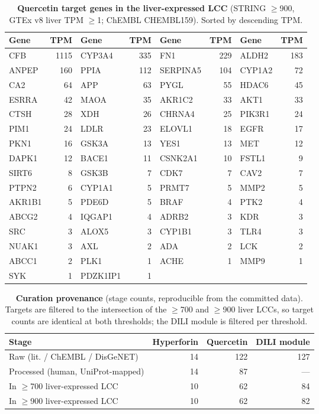 \begin{table}[ht]
\centering
\caption{\textbf{Quercetin target genes in the liver-expressed LCC} (STRING $\geq$900, GTEx v8 liver TPM $\geq$1; ChEMBL CHEMBL159). Sorted by descending TPM.}
\label{tab:s_quer}
\scriptsize
\begin{tabular}{lrlrlrlr}
\toprule
\textbf{Gene} & \textbf{TPM} & \textbf{Gene} & \textbf{TPM} & \textbf{Gene} & \textbf{TPM} & \textbf{Gene} & \textbf{TPM} \\
\midrule
CFB & 1115 & CYP3A4 & 335 & FN1 & 229 & ALDH2 & 183 \\
ANPEP & 160 & PPIA & 112 & SERPINA5 & 104 & CYP1A2 & 72 \\
CA2 & 64 & APP & 63 & PYGL & 55 & HDAC6 & 45 \\
ESRRA & 42 & MAOA & 35 & AKR1C2 & 33 & AKT1 & 33 \\
CTSH & 28 & XDH & 26 & CHRNA4 & 25 & PIK3R1 & 24 \\
PIM1 & 24 & LDLR & 23 & ELOVL1 & 18 & EGFR & 17 \\
PKN1 & 16 & GSK3A & 13 & YES1 & 13 & MET & 12 \\
DAPK1 & 12 & BACE1 & 11 & CSNK2A1 & 10 & FSTL1 & 9 \\
SIRT6 & 8 & GSK3B & 7 & CDK7 & 7 & CAV2 & 7 \\
PTPN2 & 6 & CYP1A1 & 5 & PRMT7 & 5 & MMP2 & 5 \\
AKR1B1 & 5 & PDE6D & 5 & BRAF & 4 & PTK2 & 4 \\
ABCG2 & 4 & IQGAP1 & 4 & ADRB2 & 3 & KDR & 3 \\
SRC & 3 & ALOX5 & 3 & CYP1B1 & 3 & TLR4 & 3 \\
NUAK1 & 3 & AXL & 2 & ADA & 2 & LCK & 2 \\
ABCC1 & 2 & PLK1 & 1 & ACHE & 1 & MMP9 & 1 \\
SYK & 1 & PDZK1IP1 & 1 & & & & \\
\bottomrule
\end{tabular}
\end{table}

\begin{table}[ht]
\centering
\caption{\textbf{Curation provenance} (stage counts, reproducible from the committed data). Targets are filtered to the intersection of the $\geq$700 and $\geq$900 liver LCCs, so target counts are identical at both thresholds; the DILI module is filtered per threshold.}
\label{tab:s_curation}
\begin{tabular}{@{}lrrr@{}}
\toprule
\textbf{Stage} & \textbf{Hyperforin} & \textbf{Quercetin} & \textbf{DILI module} \\
\midrule
Raw (lit. / ChEMBL / DisGeNET) & 14 & 122 & 127 \\
Processed (human, UniProt-mapped)              & 14 & 87  & --- \\
In $\geq$700 liver-expressed LCC               & 10 & 62  & 84 \\
In $\geq$900 liver-expressed LCC               & 10 & 62  & 82 \\
\bottomrule
\end{tabular}
\end{table}

